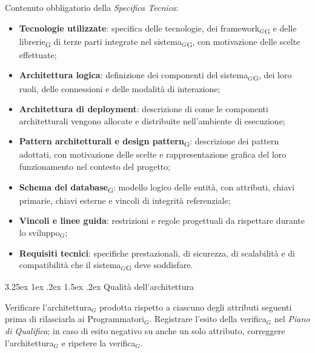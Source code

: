 \documentclass[a4paper, 10pt]{article}
\makeatletter
\renewcommand\paragraph{\@startsection{paragraph}{4}{\z@}%
  {3.25ex \@plus1ex \@minus .2ex}%
  {1.5ex \@plus .2ex}%
  {\normalfont\normalsize\bfseries}}
\makeatother
\begin{document}
\noindent Contenuto obbligatorio della \textit{Specifica Tecnica}:

\begin{itemize}
    \item \textbf{Tecnologie utilizzate}: specifica delle tecnologie, dei framework$_G$\textsubscript{G} e delle librerie\textsubscript{G} di terze parti integrate nel sistema$_G$\textsubscript{G}, con motivazione delle scelte effettuate;
    \item \textbf{Architettura logica}: definizione dei componenti del sistema$_G$\textsubscript{G}, dei loro ruoli, delle connessioni e delle modalità di interazione;
    \item \textbf{Architettura di deployment}: descrizione di come le componenti architetturali vengono allocate e distribuite nell'ambiente di esecuzione;
    \item \textbf{Pattern architetturali e design pattern}\textsubscript{G}: descrizione dei pattern adottati, con motivazione delle scelte e rappresentazione grafica del loro funzionamento nel contesto del progetto;
    \item \textbf{Schema del database}\textsubscript{G}: modello logico delle entità, con attributi, chiavi primarie, chiavi esterne e vincoli di integrità referenziale;
    \item \textbf{Vincoli e linee guida}: restrizioni e regole progettuali da rispettare durante lo sviluppo$_G$;
    \item \textbf{Requisiti tecnici}: specifiche prestazionali, di sicurezza, di scalabilità e di compatibilità che il sistema$_G$\textsubscript{G} deve soddisfare.
\end{itemize}

\paragraph{Qualità dell'architettura}

Verificare l'architettura$_G$ prodotta rispetto a ciascuno degli attributi seguenti prima di rilasciarla ai Programmatori$_G$. Registrare l'esito della verifica$_G$ nel \textit{Piano di Qualifica}; in caso di esito negativo su anche un solo attributo, correggere l'architettura$_G$ e ripetere la verifica$_G$.
\end{document}
